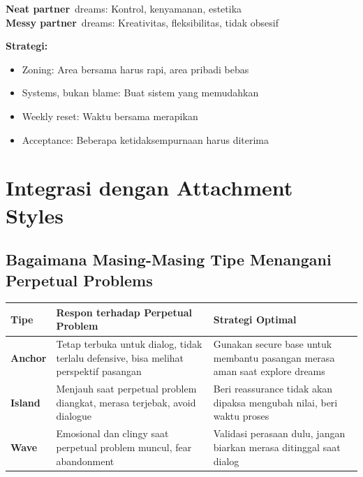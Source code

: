 \begin{insightbox}
\textbf{Neat partner}\ dreams: Kontrol, kenyamanan, estetika\\
\textbf{Messy partner}\ dreams: Kreativitas, fleksibilitas, tidak obsesif

\textbf{Strategi:}
\begin{itemize}
    \item Zoning: Area bersama harus rapi, area pribadi bebas
    \item Systems, bukan blame: Buat sistem yang memudahkan
    \item Weekly reset: Waktu bersama merapikan
    \item Acceptance: Beberapa ketidaksempurnaan harus diterima
\end{itemize}
\end{insightbox}

\section{Integrasi dengan Attachment Styles}

\subsection{Bagaimana Masing-Masing Tipe Menangani Perpetual Problems}

\begin{center}
\renewcommand{\arraystretch}{1.6}
\begin{tabular}{|>{\raggedright}p{2.5cm}|>{\raggedright}p{5.5cm}|>{\raggedright\arraybackslash}p{5.5cm}|}
\hline
\rowcolor{primary!20}
\textbf{Tipe} & \textbf{Respon terhadap Perpetual Problem} & \textbf{Strategi Optimal} \\
\hline
\textbf{Anchor} & Tetap terbuka untuk dialog, tidak terlalu defensive, bisa melihat perspektif pasangan & Gunakan secure base untuk membantu pasangan merasa aman saat explore dreams \\
\hline
\textbf{Island} & Menjauh saat perpetual problem diangkat, merasa terjebak, avoid dialogue & Beri reassurance tidak akan dipaksa mengubah nilai, beri waktu proses \\
\hline
\textbf{Wave} & Emosional dan clingy saat perpetual problem muncul, fear abandonment & Validasi perasaan dulu, jangan biarkan merasa ditinggal saat dialog \\
\hline
\end{tabular}
\end{center}

